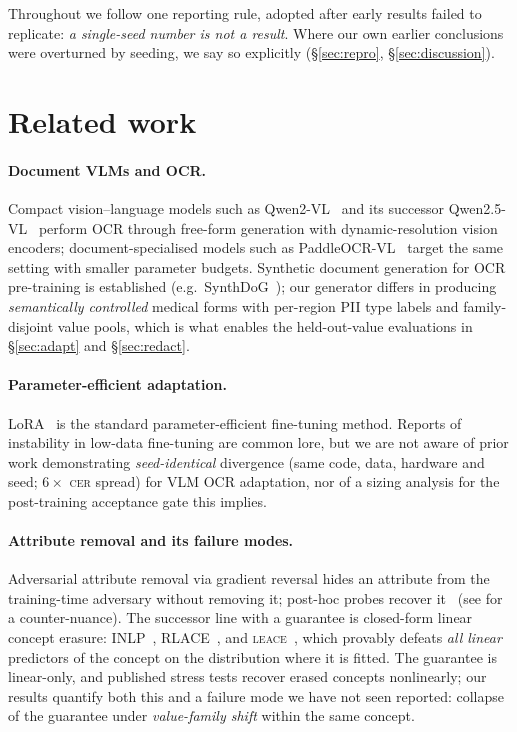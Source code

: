 \documentclass[11pt]{article}
\newcommand{\cer}{\textsc{cer}}
\newcommand{\leace}{\textsc{leace}}
\begin{document}
Throughout we follow one reporting rule, adopted after early results failed
to replicate: \emph{a single-seed number is not a result}. Where our own
earlier conclusions were overturned by seeding, we say so explicitly
(\S\ref{sec:repro}, \S\ref{sec:discussion}).

\section{Related work}\label{sec:related}

\paragraph{Document VLMs and OCR.} Compact vision--language models such as
Qwen2-VL~\cite{wang2024qwen2vl} and its successor
Qwen2.5-VL~\cite{bai2025qwen25vl} perform OCR through free-form generation
with dynamic-resolution vision encoders; document-specialised models such as
PaddleOCR-VL~\cite{paddleocrvl} target the same setting with smaller
parameter budgets. Synthetic document generation for OCR pre-training is
established (e.g.\ SynthDoG~\cite{kim2022donut}); our generator differs in
producing \emph{semantically controlled} medical forms with per-region PII
type labels and family-disjoint value pools, which is what enables the
held-out-value evaluations in \S\ref{sec:adapt} and \S\ref{sec:redact}.

\paragraph{Parameter-efficient adaptation.} LoRA~\cite{hu2022lora} is the
standard parameter-efficient fine-tuning method. Reports of instability in
low-data fine-tuning are common lore, but we are not aware of prior work
demonstrating \emph{seed-identical} divergence (same code, data, hardware
and seed; $6\times$ \cer{} spread) for VLM OCR adaptation, nor of a sizing
analysis for the post-training acceptance gate this implies.

\paragraph{Attribute removal and its failure modes.} Adversarial attribute
removal via gradient reversal hides an attribute from the training-time
adversary without removing it; post-hoc probes recover
it~\cite{elazar2018adversarial,gonen2019lipstick} (see
\cite{barrett2019adversarial} for a counter-nuance). The successor line with
a guarantee is closed-form linear concept erasure:
INLP~\cite{ravfogel2020null}, RLACE~\cite{ravfogel2022linear}, and
\leace{}~\cite{belrose2023leace}, which provably defeats \emph{all linear}
predictors of the concept on the distribution where it is fitted. The
guarantee is linear-only, and published stress tests recover erased concepts
nonlinearly; our results quantify both this and a failure mode we have not
seen reported: collapse of the guarantee under \emph{value-family shift}
within the same concept.
\end{document}
